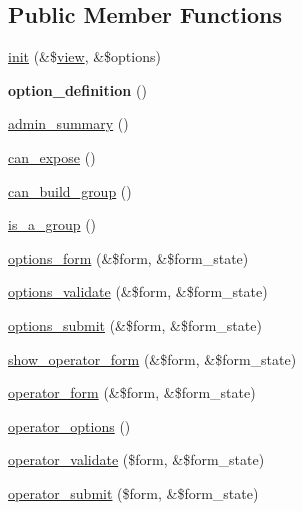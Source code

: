\subsection*{Public Member Functions}
\begin{DoxyCompactItemize}
\item 
\hyperlink{classviews__handler__filter_a4c1eb0bdb4f81b5a2b2de137e1ffe2cd}{init} (\&\$\hyperlink{classview}{view}, \&\$options)
\item 
\hypertarget{classviews__handler__filter_a053c9173084f1409a92eb390854ec304}{
{\bfseries option\_\-definition} ()}
\label{classviews__handler__filter_a053c9173084f1409a92eb390854ec304}

\item 
\hyperlink{classviews__handler__filter_a655263cd0b73188eec064b9a9743fe4c}{admin\_\-summary} ()
\item 
\hyperlink{classviews__handler__filter_af0e5810a2a2f194cd6af0fca9c858756}{can\_\-expose} ()
\item 
\hyperlink{classviews__handler__filter_a0cf3ce8c3731939c5fffa1c9d77381a1}{can\_\-build\_\-group} ()
\item 
\hyperlink{classviews__handler__filter_a4a7529b9fa68f93d5343c861e7c67c3d}{is\_\-a\_\-group} ()
\item 
\hyperlink{classviews__handler__filter_af14c69367162057a32709a6340de0988}{options\_\-form} (\&\$form, \&\$form\_\-state)
\item 
\hyperlink{classviews__handler__filter_a1156751e912662ce47ad680cbe2c03a3}{options\_\-validate} (\&\$form, \&\$form\_\-state)
\item 
\hyperlink{classviews__handler__filter_ad93c8118dcd40fc5194a806e2986a300}{options\_\-submit} (\&\$form, \&\$form\_\-state)
\item 
\hyperlink{classviews__handler__filter_ad24ef0dda8c7441b9b471aec9052a0a5}{show\_\-operator\_\-form} (\&\$form, \&\$form\_\-state)
\item 
\hyperlink{classviews__handler__filter_a8c77c0a8bba8c3ceceae8950fc7b1121}{operator\_\-form} (\&\$form, \&\$form\_\-state)
\item 
\hyperlink{classviews__handler__filter_acbd69b92e9199530a54069c79368db7f}{operator\_\-options} ()
\item 
\hyperlink{classviews__handler__filter_a63a138e4e07e0537e2ece65bc7a9784e}{operator\_\-validate} (\$form, \&\$form\_\-state)
\item 
\hyperlink{classviews__handler__filter_ae9dbe89c9a8f6017492217c25d81ba53}{operator\_\-submit} (\$form, \&\$form\_\-state)

\end{DoxyCompactItemize}
